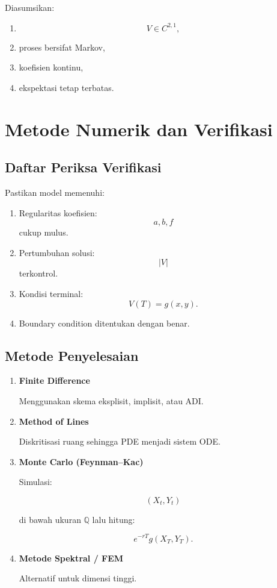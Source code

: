 \documentclass[12pt,a4paper]{article}
\begin{document}
Diasumsikan:

\begin{enumerate}
\item
\[
V\in C^{2,1},
\]

\item proses bersifat Markov,

\item koefisien kontinu,

\item ekspektasi tetap terbatas.
\end{enumerate}

\section{Metode Numerik dan Verifikasi}

\subsection*{Daftar Periksa Verifikasi}

Pastikan model memenuhi:

\begin{enumerate}
\item Regularitas koefisien:
\[
a,b,f
\]
cukup mulus.

\item Pertumbuhan solusi:
\[
|V|
\]
terkontrol.

\item Kondisi terminal:
\[
V(T)=g(x,y).
\]

\item Boundary condition ditentukan dengan benar.
\end{enumerate}

\subsection*{Metode Penyelesaian}

\begin{enumerate}

\item \textbf{Finite Difference}

Menggunakan skema eksplisit, implisit, atau ADI.

\item \textbf{Method of Lines}

Diskritisasi ruang sehingga PDE menjadi sistem ODE.

\item \textbf{Monte Carlo (Feynman--Kac)}

Simulasi:

\[
(X_t,Y_t)
\]

di bawah ukuran $\mathbb Q$ lalu hitung:

\[
e^{-rT}g(X_T,Y_T).
\]

\item \textbf{Metode Spektral / FEM}

Alternatif untuk dimensi tinggi.

\end{enumerate}
\end{document}
